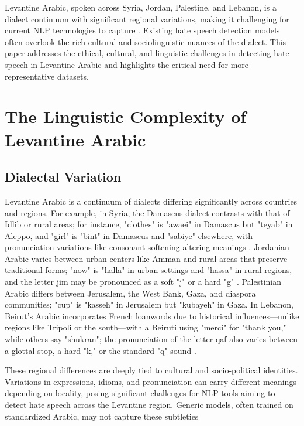 \documentclass[11pt]{article}
\begin{document}
Levantine Arabic, spoken across Syria, Jordan, Palestine, and Lebanon, is a dialect continuum with significant regional variations, making it challenging for current NLP technologies to capture \citep{haff2022currasbaladilevantine}. Existing hate speech detection models often overlook the rich cultural and sociolinguistic nuances of the dialect. This paper addresses the ethical, cultural, and linguistic challenges in detecting hate speech in Levantine Arabic and highlights the critical need for more representative datasets.


\section{The Linguistic Complexity of Levantine Arabic}

\subsection{Dialectal Variation}

Levantine Arabic is a continuum of dialects differing significantly across countries and regions. For example, in Syria, the Damascus dialect contrasts with that of Idlib or rural areas; for instance, "clothes" is "awaei" in Damascus but "teyab" in Aleppo, and "girl" is "bint" in Damascus and "sabiye" elsewhere, with pronunciation variations like consonant softening altering meanings \citep{Naïm+2012+920+935}. Jordanian Arabic varies between urban centers like Amman and rural areas that preserve traditional forms; "now" is "halla" in urban settings and "hassa" in rural regions, and the letter jim may be pronounced as a soft "j" or a hard "g" \citep{c3909b9d-f472-38b7-b06d-dfca0dcd22bb}. Palestinian Arabic differs between Jerusalem, the West Bank, Gaza, and diaspora communities; "cup" is "kasseh" in Jerusalem but "kubayeh" in Gaza. In Lebanon, Beirut's Arabic incorporates French loanwords due to historical influences—unlike regions like Tripoli or the south—with a Beiruti using "merci" for "thank you," while others say "shukran"; the pronunciation of the letter qaf also varies between a glottal stop, a hard "k," or the standard "q" sound \citep{obégi1971phonemic, Naïm+2012+920+935}.

These regional differences are deeply tied to cultural and socio-political identities. Variations in expressions, idioms, and pronunciation can carry different meanings depending on locality, posing significant challenges for NLP tools aiming to detect hate speech across the Levantine region. Generic models, often trained on standardized Arabic, may not capture these subtleties
\end{document}
